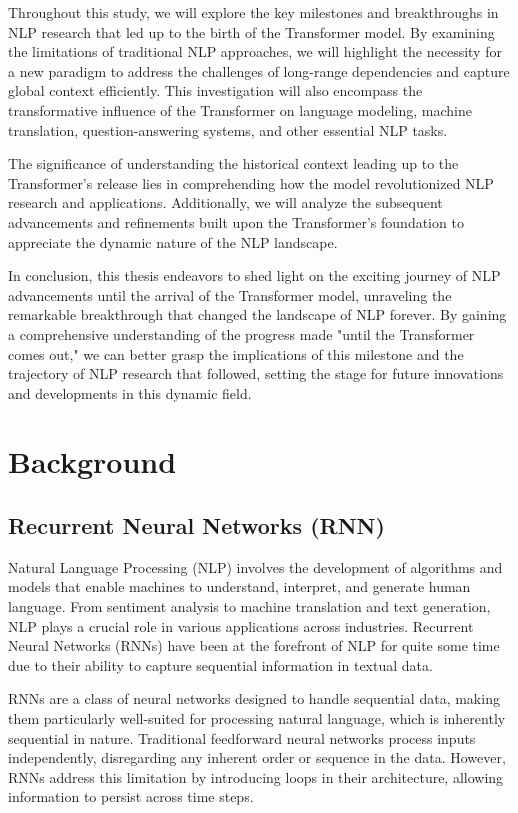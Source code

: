 \documentclass{article}
\begin{document}
Throughout this study, we will explore the key milestones and breakthroughs in NLP research that led up to the birth of the Transformer model. By examining the limitations of traditional NLP approaches, we will highlight the necessity for a new paradigm to address the challenges of long-range dependencies and capture global context efficiently. This investigation will also encompass the transformative influence of the Transformer on language modeling, machine translation, question-answering systems, and other essential NLP tasks.

The significance of understanding the historical context leading up to the Transformer's release lies in comprehending how the model revolutionized NLP research and applications. Additionally, we will analyze the subsequent advancements and refinements built upon the Transformer's foundation to appreciate the dynamic nature of the NLP landscape.

In conclusion, this thesis endeavors to shed light on the exciting journey of NLP advancements until the arrival of the Transformer model, unraveling the remarkable breakthrough that changed the landscape of NLP forever. By gaining a comprehensive understanding of the progress made "until the Transformer comes out," we can better grasp the implications of this milestone and the trajectory of NLP research that followed, setting the stage for future innovations and developments in this dynamic field.


\section{Background}


\subsection{Recurrent Neural Networks (RNN)}

Natural Language Processing (NLP) involves the development of algorithms and models that enable machines to understand, interpret, and generate human language. From sentiment analysis to machine translation and text generation, NLP plays a crucial role in various applications across industries. Recurrent Neural Networks (RNNs) have been at the forefront of NLP for quite some time due to their ability to capture sequential information in textual data.

RNNs are a class of neural networks designed to handle sequential data, making them particularly well-suited for processing natural language, which is inherently sequential in nature. Traditional feedforward neural networks process inputs independently, disregarding any inherent order or sequence in the data. However, RNNs address this limitation by introducing loops in their architecture, allowing information to persist across time steps.
\end{document}
